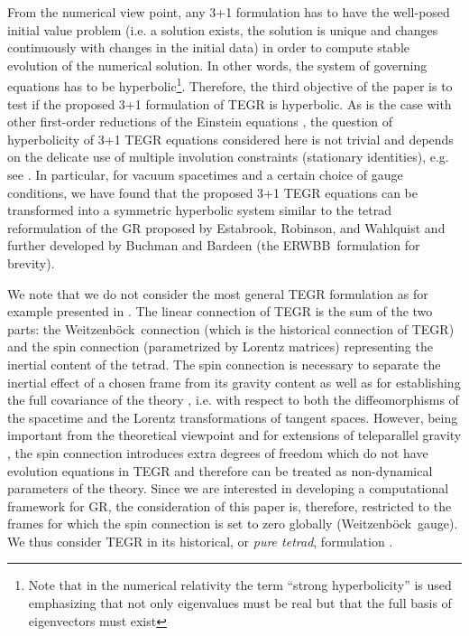 \documentclass[
10pt, %
a4paper, %
oneside, %
twocolumn,
headinclude,footinclude, %
BCOR5mm, %
]{scrartcl}
\newcommand{\ERWBB}{{ERWBB}}
\newcommand{\We}{Weitzenb\"ock}
\begin{document}
	From the numerical view point, any 3+1 formulation has to have the
	well-posed initial value problem (i.e. a solution exists, the solution is
	unique and changes continuously with changes in the initial data) in order
	to compute stable evolution of the numerical solution. In other words, the
	system of governing equations has to be hyperbolic\footnote{Note that in the
	numerical relativity the term ``strong hyperbolicity'' is used emphasizing
	that not only eigenvalues must be real but that the full basis of
	eigenvectors must exist}. Therefore, the third objective of the paper is to
	test if the proposed 3+1 formulation of TEGR is hyperbolic. As is the case
	with other first-order reductions of the Einstein equations
	\cite{Baumgarte2003a}, the question of hyperbolicity of 3+1 TEGR equations
	considered here is not trivial and depends on the delicate use of multiple
	involution constraints (stationary identities), e.g. see \cite{FO-CCZ4}. In
	particular, for vacuum spacetimes and a certain choice of gauge conditions,
	we have found that the proposed 3+1 TEGR equations can be transformed into a
	symmetric hyperbolic system similar to the tetrad reformulation of the GR
	proposed by Estabrook, Robinson, and Wahlquist \cite{Estabrook1997} and
	further developed by Buchman and Bardeen
	\cite{Buchman2003,Buchman2005,Bardeen2011} (the \ERWBB\ formulation for
	brevity). 
	
	We note that we do not consider the most general TEGR formulation as for
	example presented in \cite{AldrovandiPereiraBook}. The linear connection of
	TEGR is the sum of the two parts: the \We\ connection (which is the
	historical connection of TEGR) and the spin connection (parametrized by
	Lorentz matrices) representing the inertial content of the tetrad. The spin
	connection is necessary to separate the inertial effect of a chosen frame
	from its gravity content as well as for establishing the full covariance of
	the theory \cite{AldrovandiPereiraBook,Golovnev2017a,Krssak2019}, i.e. with
	respect to both the diffeomorphisms of the spacetime and the Lorentz
	transformations of tangent spaces. However, being important from the
	theoretical viewpoint and for extensions of teleparallel gravity
	\cite{Golovnev2017a}, the spin connection introduces extra degrees of
	freedom which do not have evolution equations in TEGR and therefore can be
	treated as non-dynamical parameters of the theory. Since we are
	interested in developing a computational framework for GR, the consideration
	of this paper is, therefore, restricted to the frames for which the spin
	connection is set to zero globally (\We\ gauge). We thus consider TEGR in
	its historical, or \emph{pure tetrad}, formulation \cite{Golovnev2017a}.
	
\end{document}
